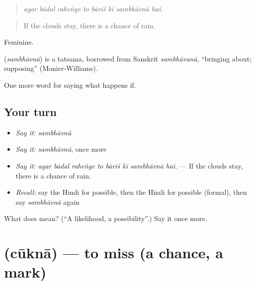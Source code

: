 \begin{quote}
       
\end{quote}

\begin{quote}
\emph{agar bādal raheṅge to bāriś kī sambhāvnā hai.}
\end{quote}

\begin{quote}
If the clouds stay, there is a chance of rain.
\end{quote}

Feminine.

\begin{cousinweb}
\textbf{} (\emph{sambhāvnā}) is a tatsama, borrowed from Sanskrit \emph{sambhāvanā}, \textquotedblleft{}bringing about; supposing\textquotedblright{} (Monier-Williams).
\end{cousinweb}

\begin{grammarlens}[title={What you've built}]
One more word for saying what happens if.
\end{grammarlens}

\subsection*{Your turn}
\begin{itemize}
\raggedright
  \item \emph{Say it:} \emph{sambhāvnā}
  \item \emph{Say it:} \emph{sambhāvnā}, once more
  \item \emph{Say it:} \emph{agar bādal raheṅge to bāriś kī sambhāvnā hai.} — If the clouds stay, there is a chance of rain.
  \item \emph{Recall:} say the Hindi for possible, then the Hindi for possible (formal), then say \emph{sambhāvnā} again
\end{itemize}

\begin{tcolorbox}[breakable,colback=teal!4,colframe=teal!35!black,title={Before you move on}]
What does  mean? (\textquotedblleft{}A likelihood, a possibility\textquotedblright{}.) Say it once more.
\end{tcolorbox}
\section[\texorpdfstring{\hi{चूकना} (cūknā)}{चूकना (cūknā)}]{ (cūknā) — to miss (a chance, a mark)}

